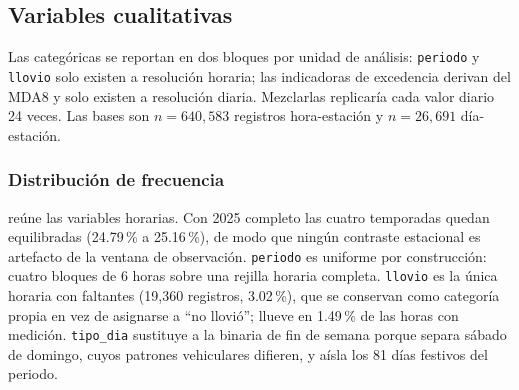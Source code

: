 \subsection{Variables cualitativas}
\label{sec:eda-cualitativas}

Las categóricas se reportan en dos bloques por unidad de análisis:
\texttt{periodo} y \texttt{llovio} solo existen a resolución horaria; las
indicadoras de excedencia derivan del MDA8 y solo existen a resolución
diaria. Mezclarlas replicaría cada valor diario 24 veces. Las bases son
$n = 640{,}583$ registros hora-estación y $n = 26{,}691$ día-estación.

\subsubsection{Distribución de frecuencia}

 reúne las variables horarias. Con 2025 completo las
cuatro temporadas quedan equilibradas (24.79\,\% a 25.16\,\%), de modo que
ningún contraste estacional es artefacto de la ventana de observación.
\texttt{periodo} es uniforme por construcción: cuatro bloques de 6 horas
sobre una rejilla horaria completa. \texttt{llovio} es la única horaria con
faltantes (19,360 registros, 3.02\,\%), que se conservan como categoría
propia en vez de asignarse a ``no llovió''; llueve en 1.49\,\% de las horas
con medición. \texttt{tipo\_dia} sustituye a la binaria de fin de semana
porque separa sábado de domingo, cuyos patrones vehiculares difieren, y
aísla los 81 días festivos del periodo.

